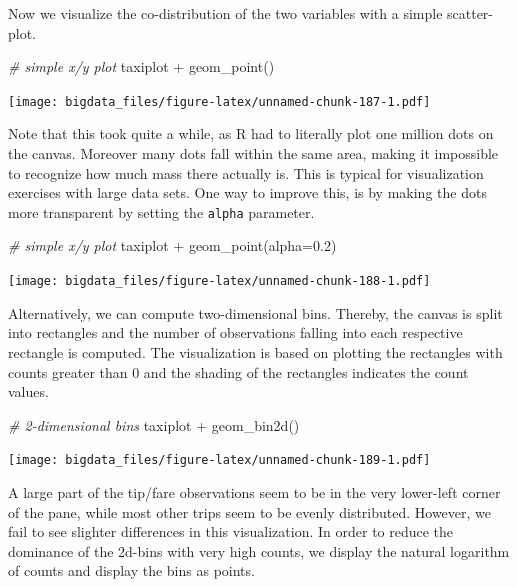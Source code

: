 \documentclass[
  12pt,
]{style/krantz}
\newenvironment{Shaded}{\begin{snugshade}}{\end{snugshade}}
\newcommand{\AttributeTok}[1]{\textcolor[rgb]{0.77,0.63,0.00}{#1}}
\newcommand{\CommentTok}[1]{\textcolor[rgb]{0.56,0.35,0.01}{\textit{#1}}}
\newcommand{\FloatTok}[1]{\textcolor[rgb]{0.00,0.00,0.81}{#1}}
\newcommand{\FunctionTok}[1]{\textcolor[rgb]{0.00,0.00,0.00}{#1}}
\newcommand{\NormalTok}[1]{#1}
\newcommand{\SpecialCharTok}[1]{\textcolor[rgb]{0.00,0.00,0.00}{#1}}
\begin{document}
Now we visualize the co-distribution of the two variables with a simple scatter-plot.

\begin{Shaded}
\begin{Highlighting}[]
\CommentTok{\# simple x/y plot}
\NormalTok{taxiplot }\SpecialCharTok{+}
     \FunctionTok{geom\_point}\NormalTok{()}
\end{Highlighting}
\end{Shaded}

\texttt{[image: bigdata\_files/figure-latex/unnamed-chunk-187-1.pdf]}

Note that this took quite a while, as R had to literally plot one million dots on the canvas. Moreover many dots fall within the same area, making it impossible to recognize how much mass there actually is. This is typical for visualization exercises with large data sets. One way to improve this, is by making the dots more transparent by setting the \texttt{alpha} parameter.

\begin{Shaded}
\begin{Highlighting}[]
\CommentTok{\# simple x/y plot}
\NormalTok{taxiplot }\SpecialCharTok{+}
     \FunctionTok{geom\_point}\NormalTok{(}\AttributeTok{alpha=}\FloatTok{0.2}\NormalTok{)}
\end{Highlighting}
\end{Shaded}

\texttt{[image: bigdata\_files/figure-latex/unnamed-chunk-188-1.pdf]}

Alternatively, we can compute two-dimensional bins. Thereby, the canvas is split into rectangles and the number of observations falling into each respective rectangle is computed. The visualization is based on plotting the rectangles with counts greater than 0 and the shading of the rectangles indicates the count values.

\begin{Shaded}
\begin{Highlighting}[]
\CommentTok{\# 2{-}dimensional bins}
\NormalTok{taxiplot }\SpecialCharTok{+}
     \FunctionTok{geom\_bin2d}\NormalTok{()}
\end{Highlighting}
\end{Shaded}

\texttt{[image: bigdata\_files/figure-latex/unnamed-chunk-189-1.pdf]}

A large part of the tip/fare observations seem to be in the very lower-left corner of the pane, while most other trips seem to be evenly distributed. However, we fail to see slighter differences in this visualization. In order to reduce the dominance of the 2d-bins with very high counts, we display the natural logarithm of counts and display the bins as points.
\end{document}
